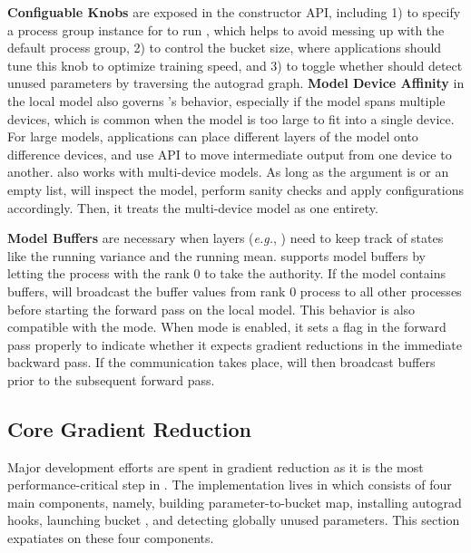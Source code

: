 \textbf{Configuable Knobs} are exposed in the  constructor API, including 1)  to specify a process group instance for  to run , which helps to avoid messing up with the default process group, 2)  to control the  bucket size, where applications should tune this knob to optimize training speed, and 3)  to toggle whether  should detect unused parameters by traversing the autograd graph.
%
\textbf{Model Device Affinity} in the local model also governs 's behavior, especially if the model spans multiple devices, which is common when the model is too large to fit into a single device. For large models, applications can place different layers of the model onto difference devices, and use  API to move intermediate output from one device to another.  also works with multi-device models. As long as the  argument is  or an empty list,  will inspect the model, perform sanity checks and apply configurations accordingly. Then, it treats the multi-device model as one entirety. 

\textbf{Model Buffers} are necessary when layers (\emph{e.g.}, ) need to keep track of states like the running variance and the running mean.  supports model buffers by letting the process with the rank 0 to take the authority. If the model contains buffers,  will broadcast the buffer values from rank 0 process to all other processes before starting the forward pass on the local model. This behavior is also compatible with the  mode. When  mode is enabled, it sets a flag in the forward pass properly to indicate whether it expects gradient reductions in the immediate backward pass. If the communication takes place,  will then broadcast buffers prior to the subsequent forward pass. 


\subsection{Core Gradient Reduction}

Major development efforts are spent in gradient reduction as it is the most performance-critical step in . The implementation lives in  which consists of four main components, namely, building parameter-to-bucket map, installing autograd hooks, launching bucket , and detecting globally unused parameters. This section expatiates on these four components.

